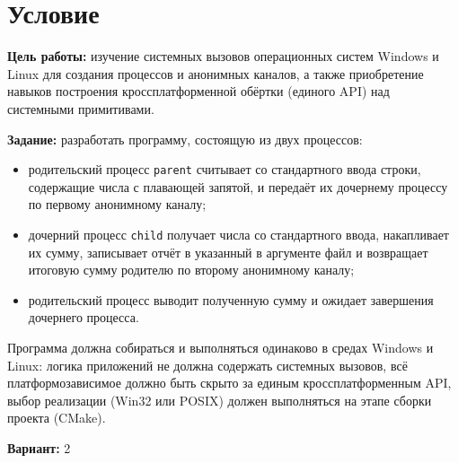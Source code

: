 \section{Условие}
{\bfseries Цель работы:} изучение системных вызовов операционных систем Windows и Linux для создания
процессов и анонимных каналов, а также приобретение навыков построения кроссплатформенной
обёртки (единого API) над системными примитивами.

{\bfseries Задание:} разработать программу, состоящую из двух процессов:
\begin{itemize}
  \item родительский процесс \texttt{parent} считывает со стандартного ввода строки,
    содержащие числа с плавающей запятой, и передаёт их дочернему процессу по первому
    анонимному каналу;
  \item дочерний процесс \texttt{child} получает числа со стандартного ввода, накапливает
    их сумму, записывает отчёт в указанный в аргументе файл и возвращает итоговую сумму
    родителю по второму анонимному каналу;
  \item родительский процесс выводит полученную сумму и ожидает завершения дочернего процесса.
\end{itemize}
Программа должна собираться и выполняться одинаково в средах Windows и Linux: логика приложений
не должна содержать системных вызовов, всё платформозависимое должно быть скрыто за единым
кроссплатформенным API, выбор реализации (Win32 или POSIX) должен выполняться на этапе сборки
проекта (CMake).

{\bfseries Вариант:} 2